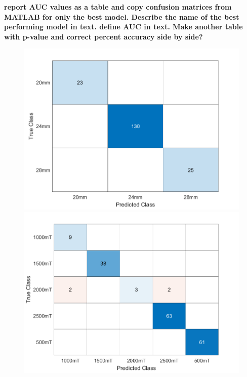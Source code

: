 \documentclass[12pt]{iopart}
\begin{document}
\textbf{report AUC values as a table and copy confusion matrices from MATLAB for only the best model. Describe the name of the best performing model in text. define AUC in text. Make another table with p-value and correct percent accuracy side by side?}

\begin{figure}[ht!]
\begin{center}
\begin{minipage}{0.495\textwidth}
    \includegraphics[width=1\textwidth]{ConfusionMatrix_SV.png}
\end{minipage}
\begin{minipage}{0.495\textwidth}
    \includegraphics[width=1\textwidth]{ConfusionMatrixTB.png}
\end{minipage}


\end{center}
\end{figure}
\end{document}
